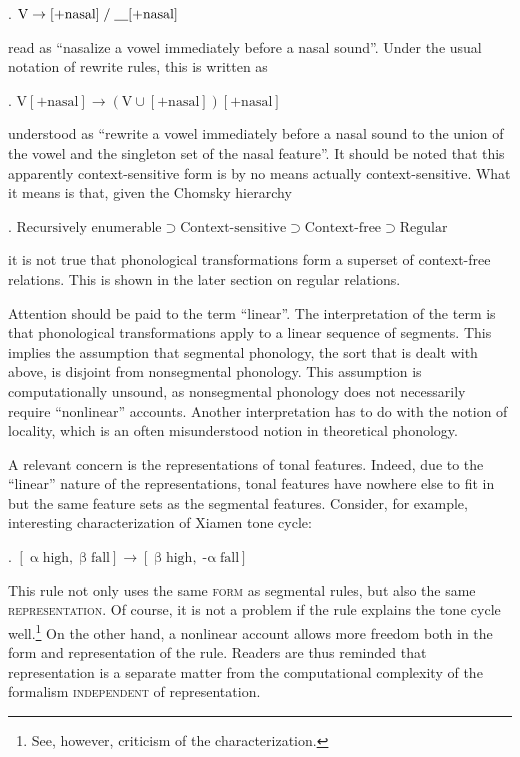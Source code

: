 \documentclass[12pt, a4paper]{report}
\newcommand{\context}{\mathrel{/}}
\newcommand{\gap}{\underline{\hspace{1em}}}
\newcommand{\textemph}[1]{\textsc{#1}}
\begin{document}
\ex. \(\text{V} \to [+\text{nasal}]
\context \text{\gap}[+\text{nasal}]\)

read as \enquote{nasalize a vowel immediately before a nasal sound}.
Under the usual notation of rewrite rules, this is written as

\ex. \(\text{V}[+\text{nasal}] \to
(\text{V} \cup [+\text{nasal}])[+\text{nasal}]\)

understood as \enquote{rewrite a vowel immediately before a nasal
  sound to the union of the vowel and the singleton set of the nasal
  feature}.  It should be noted that this apparently context-sensitive
form is by no means actually context-sensitive.  What it means is
that, given the Chomsky hierarchy \parencite{c59cfpg}

\ex. \(\text{Recursively enumerable} \supset
\text{Context-sensitive} \supset
\text{Context-free} \supset
\text{Regular}\)

it is not true that phonological transformations form a superset of
context-free relations.  This is shown in the later section on regular
relations.

Attention should be paid to the term \enquote{linear}.  The
interpretation of the term is that phonological transformations apply
to a linear sequence of segments.  This implies the assumption that
segmental phonology, the sort that is dealt with above, is disjoint
from nonsegmental phonology.  This assumption is computationally
unsound, as nonsegmental phonology does not necessarily require
\enquote{nonlinear} accounts.  Another interpretation has to do with
the notion of locality, which is an often misunderstood notion in
theoretical phonology.

A relevant concern is the representations of tonal features.  Indeed,
due to the \enquote{linear} nature of the representations, tonal
features have nowhere else to fit in but the same feature sets as the
segmental features.  Consider, for example, 
interesting characterization of Xiamen tone cycle:

\ex. \([\mathop{\alpha}\text{high}, \mathop{\beta}\text{fall}]
\to [\mathop{\beta}\text{high}, \mathop{-\alpha}\text{fall}]\)

This rule not only uses the same \textemph{form} as segmental rules,
but also the same \textemph{representation}.  Of course, it is not a
problem if the rule explains the tone cycle well.\footnote{See,
  however,  criticism of the characterization.}  On
the other hand, a nonlinear account allows more freedom both in the
form and representation of the rule.  Readers are thus reminded that
representation is a separate matter from the computational complexity
of the formalism \textemph{independent} of representation.
\end{document}
